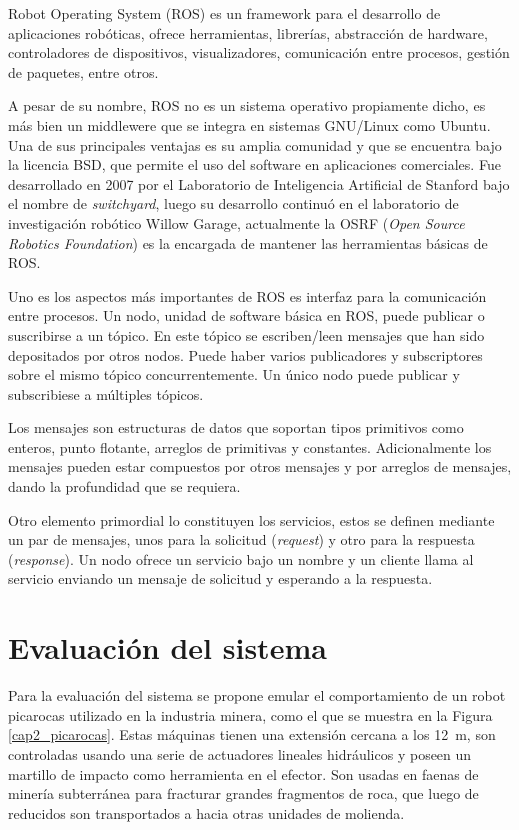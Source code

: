 Robot Operating System (ROS) \cite{quigley2009} es un  framework para el desarrollo de aplicaciones robóticas, ofrece herramientas, librerías, abstracción de hardware, controladores de dispositivos, visualizadores, comunicación entre procesos, gestión de paquetes, entre otros.

A pesar de su nombre, ROS no es un sistema operativo propiamente dicho, es más bien un middlewere que se integra en sistemas GNU/Linux como Ubuntu. Una de sus principales ventajas es su amplia comunidad y que se encuentra bajo la licencia BSD, que permite el uso del software en aplicaciones comerciales. Fue desarrollado en 2007 por el Laboratorio de Inteligencia Artificial de Stanford bajo el nombre de \textit{switchyard}, luego su desarrollo continuó en el laboratorio de investigación robótico Willow Garage, actualmente la OSRF (\textit{Open Source Robotics Foundation}) es la encargada de mantener las herramientas básicas de ROS.

Uno es los aspectos más importantes de ROS es interfaz para la comunicación entre procesos. Un nodo, unidad de software básica en ROS, puede publicar o suscribirse a un tópico. En este tópico se escriben/leen mensajes que han sido depositados por otros nodos. Puede haber varios publicadores y subscriptores sobre el mismo tópico concurrentemente. Un único nodo puede publicar y subscribiese a múltiples tópicos.

Los mensajes son estructuras de datos que soportan tipos primitivos como
enteros, punto flotante, arreglos de primitivas y constantes. Adicionalmente los mensajes pueden estar compuestos por otros mensajes y por arreglos de mensajes, dando la profundidad que se requiera.

Otro elemento primordial lo constituyen los servicios, estos se definen mediante un par de mensajes, unos para la solicitud (\textit{request}) y otro para la respuesta (\textit{response}). Un nodo ofrece un servicio bajo un nombre y un cliente llama al servicio enviando un mensaje de solicitud y esperando a la respuesta.

\section{Evaluación del sistema}

Para la evaluación del sistema se propone emular el comportamiento de un robot picarocas utilizado en la industria minera, como el que se muestra en la Figura \ref{cap2_picarocas}. Estas máquinas tienen una extensión cercana a los \SI{12}{\meter}, son controladas usando una serie de actuadores lineales hidráulicos y poseen un martillo de impacto como herramienta  en el efector. Son usadas en faenas de minería subterránea para fracturar grandes fragmentos de roca, que luego de reducidos son transportados a hacia otras unidades de molienda.

